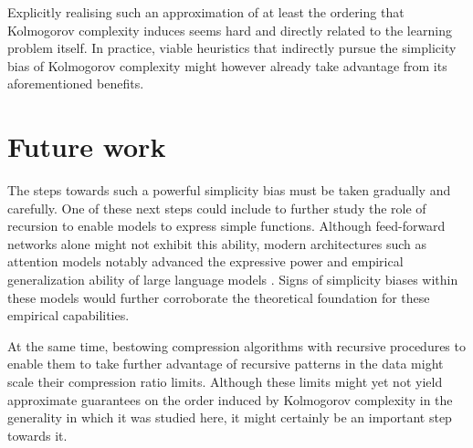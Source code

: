 Explicitly realising such an approximation of at least the ordering that Kolmogorov complexity induces seems hard and directly related to the learning problem itself. 
In practice, viable heuristics that indirectly pursue the simplicity bias of Kolmogorov complexity might however already take advantage from its aforementioned benefits.

\section{Future work}
The steps towards such a powerful simplicity bias must be taken gradually and carefully.
One of these next steps could include to further study the role of recursion to enable models to express simple functions.
Although feed-forward networks alone might not exhibit this ability, modern architectures such as attention models notably advanced the expressive power and empirical generalization ability of large language models \cite{brown2020language}.
Signs of simplicity biases within these models would further corroborate the theoretical foundation for these empirical capabilities.

At the same time, bestowing compression algorithms with recursive procedures to enable them to take further advantage of recursive patterns in the data might scale their compression ratio limits.
Although these limits might yet not yield approximate guarantees on the order induced by Kolmogorov complexity in the generality in which it was studied here, it might certainly be an important step towards it.

